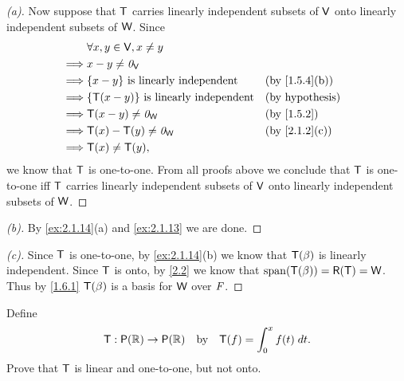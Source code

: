 \begin{proof}[(a)]
	Now suppose that \(\mathsf{T}\) carries linearly independent subsets of \(\mathsf{V}\) onto linearly independent subsets of \(\mathsf{W}\).
	Since
	\begin{align*}
		         & \forall x, y \in \V, x \neq y                                               \\
		\implies & x - y \neq \zv_{\V}                                                         \\
		\implies & \set{x - y} \text{ is linearly independent}     &  & \by{1.5.4}[b]          \\
		\implies & \set{\T(x - y)} \text{ is linearly independent} &  & \text{(by hypothesis)} \\
		\implies & \T(x - y) \neq \zv_{\W}                         &  & \by{1.5.2}             \\
		\implies & \T(x) - \T(y) \neq \zv_{\W}                     &  & \by{2.1.2}[c]          \\
		\implies & \T(x) \neq \T(y),
	\end{align*}
	we know that \(\mathsf{T}\) is one-to-one.
	From all proofs above we conclude that \(\mathsf{T}\) is one-to-one iff \(\mathsf{T}\) carries linearly independent subsets of \(\mathsf{V}\) onto linearly independent subsets of \(\mathsf{W}\).
\end{proof}

\begin{proof}[(b)]
	By \cref{ex:2.1.14}(a) and \cref{ex:2.1.13} we are done.
\end{proof}

\begin{proof}[(c)]
	Since \(\mathsf{T}\) is one-to-one, by \cref{ex:2.1.14}(b) we know that \(\mathsf{T}(\beta)\) is linearly independent.
	Since \(\mathsf{T}\) is onto, by \cref{2.2} we know that \(\spn{\T(\beta)} = \rg{\T} = \W\).
	Thus by \cref{1.6.1} \(\mathsf{T}(\beta)\) is a basis for \(\mathsf{W}\) over \(\mathit{F}\).
\end{proof}

\begin{ex}\label{ex:2.1.15}
	Define
	\[
		\T : \ps{\R} \to \ps{\R} \quad \text{by} \quad \T(f) = \int_0^x f(t) \; dt.
	\]
	Prove that \(\mathsf{T}\) is linear and one-to-one, but not onto.
\end{ex}

